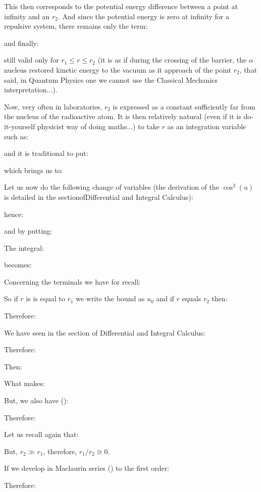 	This then corresponds to the potential energy difference between a point at infinity and an $r_2$. And since the potential energy is zero at infinity for a repulsive system, there remains only the term:
	
	and finally:
	
	still valid only for $r_1\le r \le r_2$ (it is as if during the crossing of the barrier, the $\alpha$nucleus restored kinetic energy to the vacuum as it approach of the point $r_2$, that said, in Quantum Physics one we cannot use the Classical Mechanics interpretation...).

	Now, very often in laboratories, $r_2$ is expressed as a constant sufficiently far from the nucleus of the radioactive atom. It is then relatively natural (even if it is do-it-yourself physicist way of doing maths...) to take $r$ as an integration variable such as:
	
	and it is traditional to put:
	
	which brings us to:
	
	Let us now do the following change of variables (the derivation of the $\cos^2(u)$ is detailed in the sectionofDifferential and Integral Calculus):
	
	hence:
	
	and by putting:
	
	The integral:
	
	becomes:
	
	Concerning the terminals we have for recall:
	
	So if $r$ is is equal to $r_1$ we write the bound as $u_0$ and if $r$ equals $r_2$ then:
	
	Therefore:
	
	We have seen in the section of Differential and Integral Calculus:
	
	Therefore:
	
	Then:
	
	What makes:
	
	But, we also have ():
	
	Therefore:
	
	Let us recall again that:
	
	But, $r_2 \gg r_1$, therefore, $r_1/r_2\cong 0$.
	
	If we develop in Maclaurin series () to the first order:
	
	Therefore:
	
